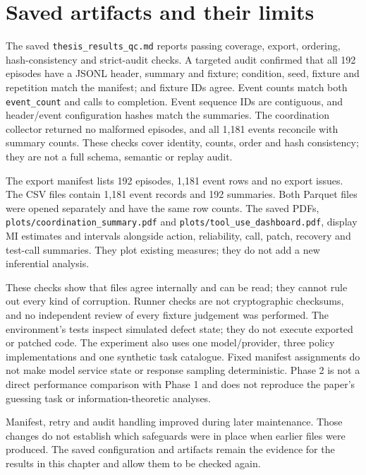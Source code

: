 \documentclass[12pt,a4paper,oneside]{report}
\begin{document}
\section{Saved artifacts and their limits}
The saved \texttt{thesis\allowbreak\_results\allowbreak\_qc.md} reports passing coverage, export, ordering, hash-consistency and strict-audit checks. A targeted audit confirmed that all 192 episodes have a JSONL header, summary and fixture; condition, seed, fixture and repetition match the manifest; and fixture IDs agree. Event counts match both \texttt{event\allowbreak\_count} and calls to completion. Event sequence IDs are contiguous, and header/event configuration hashes match the summaries. The coordination collector returned no malformed episodes, and all 1,181 events reconcile with summary counts. These checks cover identity, counts, order and hash consistency; they are not a full schema, semantic or replay audit.

The export manifest lists 192 episodes, 1,181 event rows and no export issues. The CSV files contain 1,181 event records and 192 summaries. Both Parquet files were opened separately and have the same row counts. The saved PDFs, \texttt{plots/coordination\allowbreak\_summary.pdf} and \texttt{plots/tool\allowbreak\_use\allowbreak\_dashboard.pdf}, display MI estimates and intervals alongside action, reliability, call, patch, recovery and test-call summaries. They plot existing measures; they do not add a new inferential analysis.

These checks show that files agree internally and can be read; they cannot rule out every kind of corruption. Runner checks are not cryptographic checksums, and no independent review of every fixture judgement was performed. The environment’s tests inspect simulated defect state; they do not execute exported or patched code. The experiment also uses one model/provider, three policy implementations and one synthetic task catalogue. Fixed manifest assignments do not make model service state or response sampling deterministic. Phase 2 is not a direct performance comparison with Phase 1 and does not reproduce the paper’s guessing task or information-theoretic analyses.

Manifest, retry and audit handling improved during later maintenance. Those changes do not establish which safeguards were in place when earlier files were produced. The saved configuration and artifacts remain the evidence for the results in this chapter and allow them to be checked again.
\end{document}
